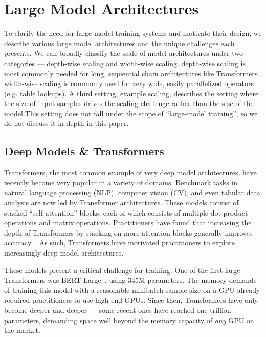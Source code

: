 \vspace{-2mm}
\section{Large Model Architectures}\label{sec:large_model}
To clarify the need for large model training systems and motivate their design, we describe various large model architectures and the unique challenges each presents. We can broadly classify the scale of model architectures under two categories --- depth-wise scaling and width-wise scaling. depth-wise scaling is most commonly needed for long, sequential chain architectures like Transformers. width-wise scaling is commonly used for very wide, easily parallelized operators (e.g. table lookups). A third setting, example scaling, describes the setting where the size of input samples drives the scaling challenge rather than the size of the model.This setting does not fall under the scope of ``large-model training'', so we do not discuss it in-depth in this paper.

\subsection{Deep Models \& Transformers}
Transformers, the most common example of very deep model architectures, have recently become very popular in a variety of domains. Benchmark tasks in natural language processing (NLP), computer vision (CV), and even tabular data analysis are now led by Transformer architectures. These models consist of stacked ``self-attention'' blocks, each of which consists of multiple dot product operations and matrix operations. Practitioners have found that increasing the depth of Transformers by stacking on more attention blocks generally improves accuracy~\cite{transformerStack}. As such, Transformers have motivated practitioners to explore increasingly deep model architectures. 

These models present a critical challenge for training. One of the first large Transformers was BERT-Large~\cite{bert2018}, using 345M parameters. The memory demands of training this model with a reasonable minibatch sample size on a GPU already required practitioners to use high-end GPUs. Since then, Transformers have only become deeper and deeper --- some recent ones have reached one trillion parameters, demanding space well beyond the memory capacity of \textit{any} GPU on the market. 

